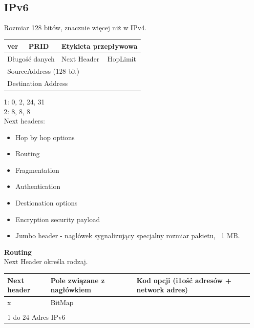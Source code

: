 \documentclass[a4paper,twoside]{article}
\begin{document}
\subsection{IPv6}
Rozmiar 128 bitów, znacznie więcej niż w IPv4.

\begin{table}[h]
	\begin{tabular}{|l|l|l|l|l|}
		\hline
		ver       & PRID       & \multicolumn{3}{l|}{Etykieta przepływowa}      \\ \hline
		\multicolumn{3}{|l|}{Długość danych} & Next Header      & HopLimit      \\ \hline
		\multicolumn{5}{|l|}{SourceAddress (128 bit)}                           \\ \hline
		\multicolumn{5}{|l|}{Destination Address}                               \\ \hline
	\end{tabular}
\end{table}
1: 0, 2, 24, 31\\
2: 8, 8, 8\\
Next headers:
\begin{itemize}
	\item Hop by hop options
	\item Routing
	\item Fragmentation
	\item Authentication
	\item Destionation options
	\item Encryption security payload
	\item Jumbo header - nagłówek sygnalizujący specjalny rozmiar pakietu, ~1 MB.
\end{itemize}
\textbf{Routing}\\
Next Header określa rodzaj.\\
\begin{table}[h]
	\begin{tabular}{|l|l|l|l|l|}
		\hline
		Next header & Pole związane z nagłówkiem & \multicolumn{3}{l|}{Kod opcji (i1ość adresów + network adres)} \\ \hline
		x           & \multicolumn{4}{l|}{BitMap}                                                                 \\ \hline
		\multicolumn{5}{|l|}{}                                                                                    \\ \hline
		\multicolumn{5}{|l|}{1 do 24 Adres IPv6}                                                                  \\ \hline
	\end{tabular}
\end{table}
\end{document}

